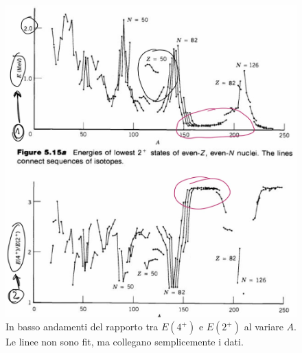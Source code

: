 \begin{figure}[h]
    \centering
    \includegraphics[scale=0.2]{Immagini/150200.png}
    \caption{In basso andamenti del rapporto tra $E(4^+)$ e $E(2^+)$ al variare $A$. Le linee non sono fit, ma collegano semplicemente i dati.}
    \label{graf2+}
\end{figure}
